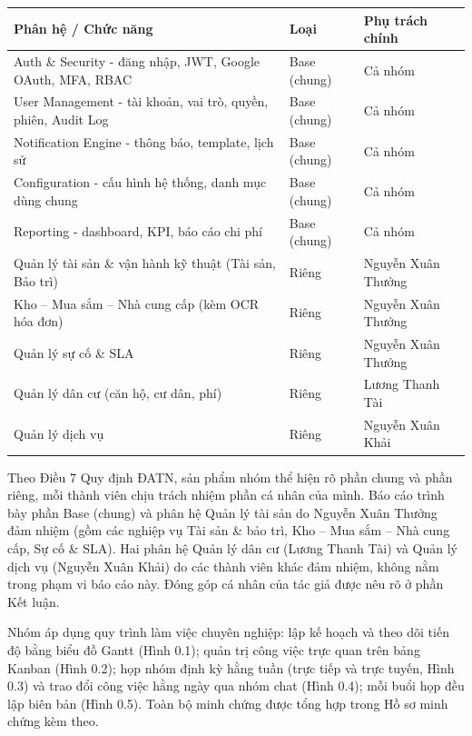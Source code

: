 \begin{center}{\singlespacing\renewcommand{\arraystretch}{1.25}
\begin{tabular}{|>{\raggedright\arraybackslash}p{}|>{\raggedright\arraybackslash}p{}|>{\raggedright\arraybackslash}p{}|}
\hline
\textbf{Phân hệ / Chức năng} & \textbf{Loại} & \textbf{Phụ trách chính} \\ \hline
Auth \& Security - đăng nhập, JWT, Google OAuth, MFA, RBAC & Base (chung) & Cả nhóm \\ \hline
User Management - tài khoản, vai trò, quyền, phiên, Audit Log & Base (chung) & Cả nhóm \\ \hline
Notification Engine - thông báo, template, lịch sử & Base (chung) & Cả nhóm \\ \hline
Configuration - cấu hình hệ thống, danh mục dùng chung & Base (chung) & Cả nhóm \\ \hline
Reporting - dashboard, KPI, báo cáo chi phí & Base (chung) & Cả nhóm \\ \hline
Quản lý tài sản \& vận hành kỹ thuật (Tài sản, Bảo trì) & Riêng & Nguyễn Xuân Thưởng \\ \hline
Kho – Mua sắm – Nhà cung cấp (kèm OCR hóa đơn) & Riêng & Nguyễn Xuân Thưởng \\ \hline
Quản lý sự cố \& SLA & Riêng & Nguyễn Xuân Thưởng \\ \hline
Quản lý dân cư (căn hộ, cư dân, phí) & Riêng & Lương Thanh Tài \\ \hline
Quản lý dịch vụ & Riêng & Nguyễn Xuân Khải \\ \hline
\end{tabular}}\end{center}
Theo Điều 7 Quy định ĐATN, sản phẩm nhóm thể hiện rõ phần chung và phần riêng, mỗi thành viên chịu trách nhiệm phần cá nhân của mình. Báo cáo trình bày phần Base (chung) và phân hệ Quản lý tài sản do Nguyễn Xuân Thưởng đảm nhiệm (gồm các nghiệp vụ Tài sản \& bảo trì, Kho – Mua sắm – Nhà cung cấp, Sự cố \& SLA). Hai phân hệ Quản lý dân cư (Lương Thanh Tài) và Quản lý dịch vụ (Nguyễn Xuân Khải) do các thành viên khác đảm nhiệm, không nằm trong phạm vi báo cáo này. Đóng góp cá nhân của tác giả được nêu rõ ở phần Kết luận.

Nhóm áp dụng quy trình làm việc chuyên nghiệp: lập kế hoạch và theo dõi tiến độ bằng biểu đồ Gantt (Hình 0.1); quản trị công việc trực quan trên bảng Kanban (Hình 0.2); họp nhóm định kỳ hằng tuần (trực tiếp và trực tuyến, Hình 0.3) và trao đổi công việc hằng ngày qua nhóm chat (Hình 0.4); mỗi buổi họp đều lập biên bản (Hình 0.5). Toàn bộ minh chứng được tổng hợp trong Hồ sơ minh chứng kèm theo.

